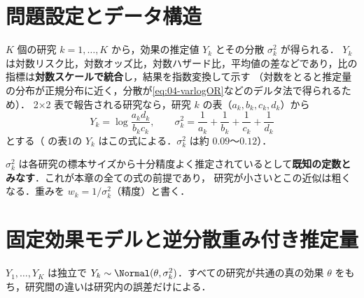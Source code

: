
\section{問題設定とデータ構造}\label{sec:18-setting}
$K$ 個の研究 $k=1,\dots,K$ から，効果の推定値 $Y_k$ とその分散 $\sigma_k^2$ が得られる．
$Y_k$ は対数リスク比，対数オッズ比，対数ハザード比，平均値の差などであり，比の指標は\textbf{対数スケールで統合}し，結果を指数変換して示す
（対数をとると推定量の分布が正規分布に近く，分散が\cref{eq:04-varlogOR}などのデルタ法で得られるため）．
2×2 表で報告される研究なら，研究 $k$ の表（$a_k,b_k,c_k,d_k$）から
\[
Y_k=\log\frac{a_kd_k}{b_kc_k},\qquad \sigma_k^2=\frac1{a_k}+\frac1{b_k}+\frac1{c_k}+\frac1{d_k}
\]
とする（ の表1の $Y_k$ はこの式による．$\sigma_k^2$ は約 $0.09$〜$0.12$）．

$\sigma_k^2$ は各研究の標本サイズから十分精度よく推定されているとして\textbf{既知の定数とみなす}．これが本章の全ての式の前提であり，
研究が小さいとこの近似は粗くなる．重みを $w_k=1/\sigma_k^2$（精度）と書く．

\section{固定効果モデルと逆分散重み付き推定量}\label{sec:18-fixed}
\Hissu\Hinshutsu
\begin{teigi}\label{def:18-fe}
$Y_1,\dots,Y_K$ は独立で $Y_k\sim\Normal(\theta,\sigma_k^2)$．すべての研究が共通の真の効果 $\theta$ をもち，研究間の違いは研究内の誤差だけによる．
\end{teigi}

